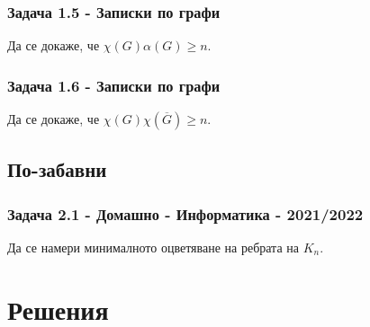 \documentclass[12pt]{article}
\begin{document}
\subsubsection*{Задача 1.5 - Записки по графи}
Да се докаже, че $\chi(G) \alpha(G) \geq n$.
\subsubsection*{Задача 1.6 - Записки по графи}
Да се докаже, че $\chi(G) \chi(\overline{G}) \geq n$.

\subsection*{По-забавни}
\subsubsection*{Задача 2.1 - Домашно - Информатика - 2021/2022}
Да се намери минималното оцветяване на ребрата на $K_n$.


\section*{Решения}
\end{document}
